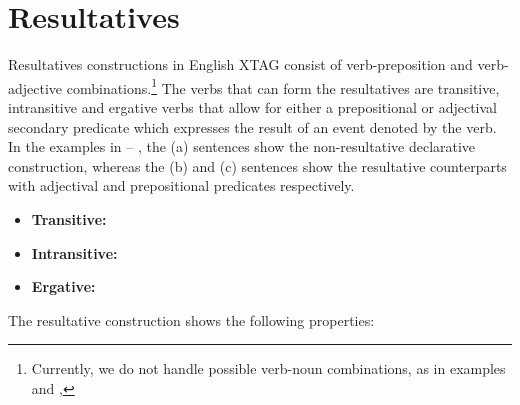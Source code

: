 \chapter{Resultatives}
\label{result_clauses}

Resultatives constructions in English XTAG consist of verb-preposition and
verb-adjective combinations.\footnote{%
%
Currently, we do not handle possible verb-noun combinations, as in examples
 and ,
%
%
} The verbs that can form the resultatives are transitive, intransitive and
ergative verbs that allow for either a prepositional or adjectival
secondary predicate which expresses the result of an event denoted by the
verb. In the examples in  -- , the (a) sentences show the
non-resultative declarative construction, whereas the (b) and (c) sentences
show the resultative counterparts with adjectival and prepositional
predicates respectively.

\begin{itemize}
\item {\bf Transitive:}

\item {\bf Intransitive:}


\item {\bf Ergative:}

\end{itemize}

The resultative construction shows the following properties:  

